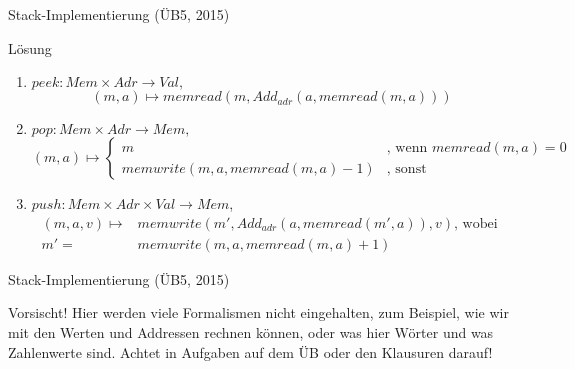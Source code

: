 \begin{frame}{Stack-Implementierung (ÜB5, 2015)}
	\begin{block}{Lösung}
		\begin{enumerate}
			\item $peek: Mem \times Adr \to Val,$ 
				\[(m,a) \mapsto memread(m, Add_{adr}(a, memread(m,a)))\]
			\item $pop: Mem \times Adr \to Mem,$
				\small{ \[(m,a) \mapsto \begin{cases}
					m & \text{, wenn } memread(m,a) = 0\\
					memwrite(m, a, memread(m,a)-1) & \text{, sonst}
				\end{cases}\]}
			\item $push: Mem \times Adr \times Val \to Mem$, \begin{align*}
						(m,a,v) \mapsto& memwrite(m', Add_{adr}(a, memread(m',a)), v) \text{, wobei } \\
						m' =& memwrite(m, a, memread(m,a)+1) 
					\end{align*}
				
		\end{enumerate}
	\end{block}
\end{frame}

\begin{frame}{Stack-Implementierung (ÜB5, 2015)}
	\begin{alertblock}{Vorsischt!}
		Hier werden viele Formalismen nicht eingehalten, zum Beispiel, wie wir mit den Werten und Addressen rechnen können, oder was hier Wörter und was Zahlenwerte sind. Achtet in Aufgaben auf dem ÜB oder den Klausuren darauf!
	\end{alertblock}
\end{frame}